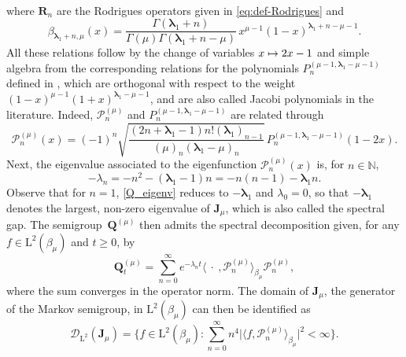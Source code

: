 \documentclass[JEP,XML,SOM,Unicode]{cedram}
\newcommand\mto{\mathchoice{\longmapsto}{\mapsto}{\mapsto}{\mapsto}}
\theoremstyle{plain}
\theoremstyle{definition}
\newcommand{\N}{\mathbb{N}}
\renewcommand{\P}{\mathcal{P}}
\newcommand{\calD}{\mathcal{D}}
\newcommand{\Rc}{\mathbf{R}}
\newcommand{\Leb}{\mathrm{L}}
\newcommand{\calJd}{\mathbf{J}}
\newcommand{\lam}{{\bm{\lambda}_1}}
\newcommand{\Q}[1][\mo]{\mathbf{Q}^{({#1})}}
\newcommand{\gab}[1][\lam,\mo]{{\beta_{#1}}}
\let\mo\mu
\begin{document}
\begin{appendix}
\begin{align}
\end{align}
where $\Rc_n$ are the Rodrigues operators given in \eqref{eq:def-Rodrigues} and
\begin{equation*}
\gab[\lam+n,\mu](x) = \frac{\Gamma(\lam+n)}{\Gamma(\mu)\Gamma(\lam+n-\mu)}\, x^{\mu-1}(1-x)^{\lam+n-\mu-1}.
\end{equation*}
All these relations follow by the change of variables $x \mto 2x-1$ and simple algebra from the corresponding relations for the polynomials $P_n^{(\mo-1,\lam-\mo-1)}$ defined in \cite[Chap.\,4]{Ismail}, which are orthogonal with respect to the weight $(1-x)^{\mo-1}(1+x)^{\lam-\mo-1}$, and are also called Jacobi polynomials in the literature. Indeed, $\P_n^{(\mo)}$ and $P_n^{(\mo-1,\lam-\mo-1)}$ are related through
\begin{equation*}
\P_n^{(\mo)}(x) = (-1)^n \sqrt{\frac{(2n+\lam-1)n!(\lam)_{n-1}}{(\mo)_n(\lam-\mo)_n}}\, P_n^{(\mo-1,\lam-\mo-1)}(1-2x).
\end{equation*}
Next, the eigenvalue associated to the eigenfunction $\P_n^{(\mo)}(x)$ is, for $n \in \N$,
\begin{equation}
\label{Q_eigenv}
-\lambda_n = -n^2-(\lam-1)n= -n(n-1)-\lam n.
\end{equation}
Observe that for $n=1$, \eqref{Q_eigenv} reduces to $-\lam$ and $\lambda_0=0$, so that $-\lam$ denotes the largest, non-zero eigenvalue of $\calJd_\mo$, which is also called the spectral gap. The semigroup~$\Q$ then admits the spectral decomposition given, for any $f \in \Leb^2(\gab[\mo])$ and $t \geq 0$, by
\begin{equation}
\label{Q_sem}
\Q_t = \sum_{n=0}^{\infty} e^{- \lambda_n t} \langle \: \cdot \:, \P^{(\mo)}_n \rangle_{\gab[\mo]} \P^{(\mo)}_n ,
\end{equation}
where the sum converges in the operator norm. The domain of $\calJd_\mo$, the generator of the Markov semigroup, in $\Leb^2(\gab[\mo])$ can then be identified as
\begin{equation*}
\calD_{\Leb^2}(\calJd_\mo) = \bigl\lbrace f \in \Leb^2(\gab[\mo]) : \textstyle\sum_{n=0}^\infty n^4 \bigl|\langle f, \P^{(\mo)}_n \rangle_{\gab[\mo]}\bigr|^2 < \infty \bigr\rbrace.
\end{equation*}

 \label{subsec:variance-decay}


\end{appendix}
\end{document}
